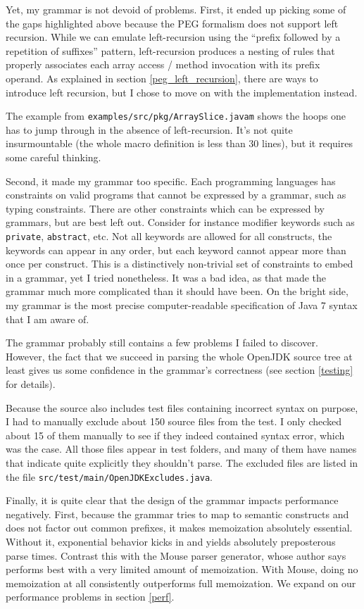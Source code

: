 Yet, my grammar is not devoid of problems. First, it ended up picking some of
the gaps highlighted above because the PEG formalism does not support left
recursion. While we can emulate left-recursion using the ``prefix followed by a
repetition of suffixes'' pattern, left-recursion produces a nesting of rules
that properly associates each array access / method invocation with its prefix
operand. As explained in section \ref{peg_left_recursion}, there are ways to
introduce left recursion, but I chose to move on with the implementation
instead.

The example from \texttt{examples/src/pkg/ArraySlice.javam} shows the hoops one
has to jump through in the absence of left-recursion. It's not quite
insurmountable (the whole macro definition is less than 30 lines), but it
requires some careful thinking.

Second, it made my grammar too specific. Each programming languages has
constraints on valid programs that cannot be expressed by a grammar, such as
typing constraints. There are other constraints which can be expressed by
grammars, but are best left out. Consider for instance modifier keywords such as
\texttt{private}, \texttt{abstract}, etc. Not all keywords are allowed for all
constructs, the keywords can appear in any order, but each keyword cannot appear
more than once per construct. This is a distinctively non-trivial set of
constraints to embed in a grammar, yet I tried nonetheless. It was a bad idea,
as that made the grammar much more complicated than it should have been. On the
bright side, my grammar is the most precise computer-readable specification of
Java 7 syntax that I am aware of.

The grammar probably still contains a few problems I failed to discover.
However, the fact that we succeed in parsing the whole OpenJDK source tree at
least gives us some confidence in the grammar's correctness (see section
\ref{testing} for details).

Because the source also includes test files containing incorrect syntax on
purpose, I had to manually exclude about 150 source files from the test. I only
checked about 15 of them manually to see if they indeed contained syntax error,
which was the case. All those files appear in test folders, and many of them
have names that indicate quite explicitly they shouldn't parse. The excluded
files are listed in the file \texttt{src/test/main/OpenJDKExcludes.java}.

Finally, it is quite clear that the design of the grammar impacts performance
negatively. First, because the grammar tries to map to semantic constructs and
does not factor out common prefixes, it makes memoization absolutely
essential. Without it, exponential behavior kicks in and yields absolutely
preposterous parse times. Contrast this with the Mouse \cite{redziejowski2009}
parser generator, whose author says performs best with a very limited amount of
memoization. With Mouse, doing no memoization at all consistently outperforms
full memoization. We expand on our performance problems in section \ref{perf}.
